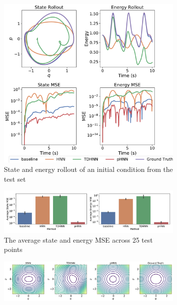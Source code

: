 \documentclass{article}
\begin{document}
\begin{figure}[!htb]
\centering
\captionsetup{justification=centering}
\begin{subfigure}[b]{0.48\textwidth}
\includegraphics[width=\textwidth]{figures/figures/forced_mass_spring/1/forced_mass_spring_long_0.pdf}
\caption{State and energy rollout of an initial condition from the test set}
\end{subfigure}
\begin{subfigure}[b]{0.48\textwidth}
\includegraphics[width=\textwidth]{figures/figures/forced_mass_spring/1/forced_mass_spring_errors_0.pdf}
\caption{The average state and energy MSE across 25 test points}
\end{subfigure}
\begin{subfigure}[b]{0.48\textwidth}
\includegraphics[width=\textwidth]{figures/figures/forced_mass_spring/1/forced_mass_spring_hamiltonian_0.pdf}

\end{subfigure}
\end{figure}
\end{document}
